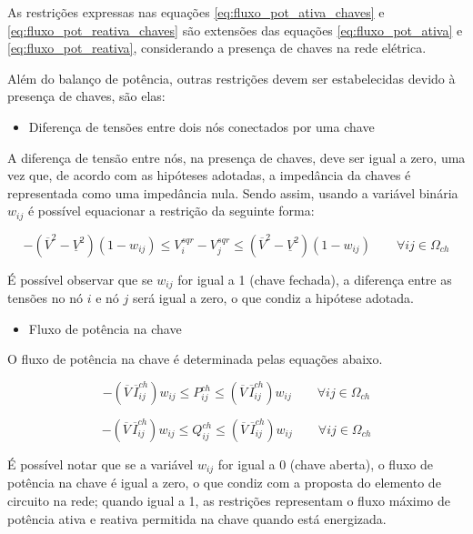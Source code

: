 As restrições expressas nas equações \eqref{eq:fluxo_pot_ativa_chaves} e \eqref{eq:fluxo_pot_reativa_chaves} são extensões das equações \eqref{eq:fluxo_pot_ativa} e \eqref{eq:fluxo_pot_reativa}, considerando a presença de chaves na rede elétrica.
    
Além do balanço de potência, outras restrições devem ser estabelecidas devido à presença de chaves, são elas:

\begin{itemize}
    \item Diferença de tensões entre dois nós conectados por uma chave
\end{itemize}

    
A diferença de tensão entre nós, na presença de chaves, deve ser igual a zero, uma vez que, de acordo com as hipóteses adotadas, a impedância da chaves é representada como uma impedância nula.
Sendo assim, usando a variável binária $w_{ij}$ é possível equacionar a restrição da seguinte forma:

\begin{equation}
    -(\overline{V}^{2} - \underline{V}^{2})(1-w_{ij}) \leq V_{i}^{sqr} - V_{j}^{sqr} \leq (\overline{V}^{2} - \underline{V}^{2})(1-w_{ij})\qquad\forall ij\in\Omega_{ch}
\end{equation}
    
É possível observar que se $w_{ij}$ for igual a 1 (chave fechada), a diferença entre as tensões no nó $i$ e nó $j$ será igual a zero, o que condiz a hipótese adotada.

\begin{itemize}
   \item Fluxo de potência na chave
\end{itemize} 
    
O fluxo de potência na chave é determinada pelas equações abaixo.
    
\begin{equation}
    -(\overline{V}\,\overline{I}_{ij}^{ch})w_{ij} \leq P_{ij}^{ch} \leq (\overline{V}\,\overline{I}_{ij}^{ch})w_{ij}\qquad\forall ij\in\Omega_{ch}   
\end{equation}
    
    
\begin{equation}
    -(\overline{V}\,\overline{I}_{ij}^{ch})w_{ij} \leq Q_{ij}^{ch} \leq (\overline{V}\,\overline{I}_{ij}^{ch})w_{ij}\qquad\forall ij\in\Omega_{ch}   
\end{equation}
    
É possível notar que se a variável $w_{ij}$ for igual a 0 (chave aberta), o fluxo de potência na chave é igual a zero, o que condiz com a proposta do elemento de circuito na rede; quando igual a 1, as restrições representam o fluxo máximo de potência ativa e reativa permitida na chave quando está energizada.

